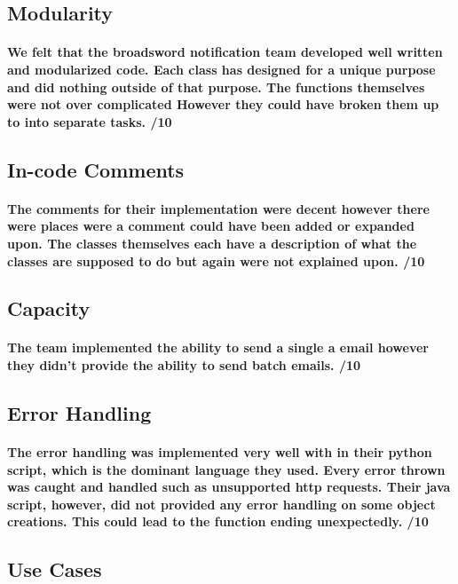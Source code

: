 \documentclass[11pt]{article}
\begin{document}
		\subsection{Modularity}
			\paragraph{We felt that the broadsword notification team developed well written and modularized code. Each class has designed for a unique purpose and did nothing outside of that purpose. The functions themselves were not over complicated However they could have broken them up to into separate tasks.  /10}
		\subsection{In-code Comments}
			\paragraph{The comments for their implementation were decent however there were places were a comment could have been added or expanded upon. The classes themselves each have a description of what the classes are supposed to do but again were not explained upon. /10}
		\subsection{Capacity}
			\paragraph{The team implemented the ability to send a single a email however they didn't provide the ability to send batch emails. /10}
		\subsection{Error Handling}
		    \paragraph{The error handling was implemented very well with in their python script, which is the dominant language they used. Every error thrown was caught and handled such as unsupported http requests. Their java script, however, did not provided any error handling on some object creations. This could lead to the function ending unexpectedly. /10}
		\subsection{Use Cases} 
\end{document}
